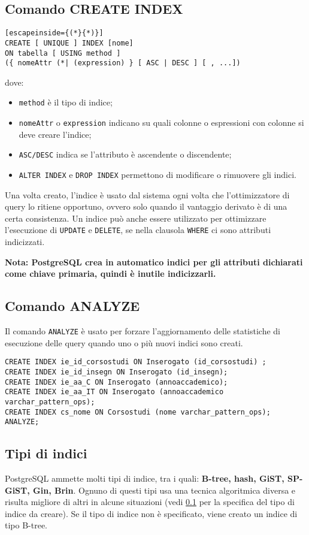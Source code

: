 \documentclass[a4paper, 10pt]{article}
\begin{document}
	\subsection{Comando CREATE INDEX} \label{createindex}
	\begin{lstlisting}[escapeinside={(*}{*)}]
CREATE [ UNIQUE ] INDEX [nome]
ON tabella [ USING method ]
({ nomeAttr (*| (expression) } [ ASC | DESC ] [ , ...])
	\end{lstlisting}
	dove:
	\begin{itemize}
		\item \verb|method| è il tipo di indice;
		\item \verb|nomeAttr| o \verb|expression| indicano su quali colonne o espressioni con colonne si deve creare l'indice;
		\item \lstinline|ASC/DESC| indica se l'attributo è ascendente o discendente;
		\item \lstinline|ALTER INDEX| e \lstinline|DROP INDEX| permettono di modificare o rimuovere gli indici.
	\end{itemize}

	Una volta creato, l'indice è usato dal sistema ogni volta che l'ottimizzatore di query lo ritiene opportuno, ovvero solo quando il vantaggio derivato è di una certa consistenza. Un indice può anche essere utilizzato per ottimizzare l'esecuzione di \lstinline|UPDATE| e \lstinline|DELETE|, se nella clausola \lstinline|WHERE| ci sono attributi indicizzati.
	
	\noindent
	\textbf{Nota: PostgreSQL crea in automatico indici per gli attributi dichiarati come chiave primaria, quindi è inutile indicizzarli.}
	
	\subsection{Comando ANALYZE}
	Il comando \lstinline|ANALYZE| è usato per forzare l'aggiornamento delle statistiche di esecuzione delle query quando uno o più nuovi indici sono creati.
	\begin{lstlisting}
CREATE INDEX ie_id_corsostudi ON Inserogato (id_corsostudi) ;
CREATE INDEX ie_id_insegn ON Inserogato (id_insegn);
CREATE INDEX ie_aa_C ON Inserogato (annoaccademico);
CREATE INDEX ie_aa_IT ON Inserogato (annoaccademico varchar_pattern_ops);
CREATE INDEX cs_nome ON Corsostudi (nome varchar_pattern_ops);
ANALYZE;
	\end{lstlisting}
	
	\subsection{Tipi di indici}
	PostgreSQL ammette molti tipi di indice, tra i quali: \textbf{B-tree, hash, GiST, SP-GiST, Gin, Brin}.
	Ognuno di questi tipi usa una tecnica algoritmica diversa e risulta migliore di altri in alcune situazioni (vedi \ref{createindex} per la specifica del tipo di indice da creare).
	Se il tipo di indice non è specificato, viene creato un indice di tipo B-tree.
	
\end{document}
